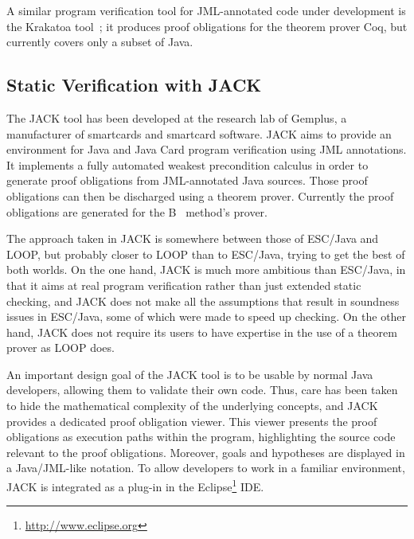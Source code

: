 \documentclass{entcs}
\begin{document}
A similar program verification tool for JML-annotated code under
development is the Krakatoa tool~\cite{krakatoa03a}; it produces proof
obligations for the theorem prover Coq, but currently covers only a
subset of Java.

\subsection{Static Verification with JACK}
\label{jack}

The JACK \cite{JACK} tool has been developed at the research lab
of Gemplus, a manufacturer of smartcards and smartcard software.  JACK
aims to provide an environment for Java and Java Card program
verification using JML annotations.  It implements a fully automated
weakest precondition calculus in order to generate proof obligations
from JML-annotated Java sources. Those proof obligations can then be
discharged using a theorem prover.  Currently the proof obligations
are generated for the B~\cite{Abrial96} method's prover.

The approach taken in JACK is somewhere between those of ESC/Java and
LOOP, but probably closer to LOOP than to ESC/Java, trying to get the
best of both worlds.  On the one hand, JACK is much more ambitious
than ESC/Java, in that it aims at real program verification rather
than just extended static checking, and JACK does not make all the
assumptions that result in soundness issues in ESC/Java, some of which
were made to speed up checking.  On the other hand, JACK does not
require its users to have expertise in the use of a theorem prover as
LOOP does.

An important design goal of the JACK tool is to be usable by normal
Java developers, allowing them to validate their own code.  Thus, care has
been taken to hide the mathematical complexity of the
underlying concepts, and JACK provides a dedicated proof obligation
viewer. This viewer presents the proof obligations as execution paths
within the program, highlighting the source code relevant to the proof
obligations. Moreover, goals and hypotheses are displayed in a
Java/JML-like notation.  To allow developers to work in a familiar
environment, JACK is integrated as a plug-in in the
Eclipse\footnote{\url{http://www.eclipse.org}} IDE\@.
\end{document}
